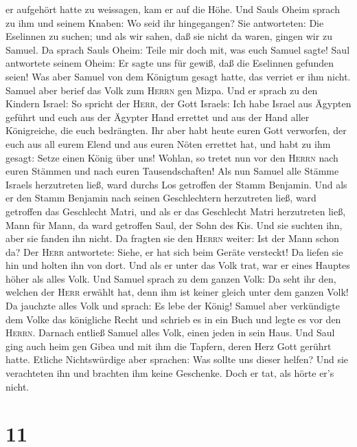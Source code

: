er aufgehört hatte zu weissagen, kam er auf die Höhe. 
Und Sauls Oheim sprach zu ihm und seinem Knaben: Wo seid ihr
hingegangen? Sie antworteten: Die Eselinnen zu suchen; und als wir
sahen, daß sie nicht da waren, gingen wir zu Samuel.  Da
sprach Sauls Oheim: Teile mir doch mit, was euch Samuel sagte!
 Saul antwortete seinem Oheim: Er sagte uns für gewiß,
daß die Eselinnen gefunden seien! Was aber Samuel von dem Königtum
gesagt hatte, das verriet er ihm nicht.  Samuel aber
berief das Volk zum \textsc{Herrn} gen Mizpa.  Und er
sprach zu den Kindern Israel: So spricht der \textsc{Herr}, der Gott
Israels: Ich habe Israel aus Ägypten geführt und euch aus der Ägypter
Hand errettet und aus der Hand aller Königreiche, die euch bedrängten.
 Ihr aber habt heute euren Gott verworfen, der euch aus
all eurem Elend und aus euren Nöten errettet hat, und habt zu ihm
gesagt: Setze einen König über uns! Wohlan, so tretet nun vor den
\textsc{Herrn} nach euren Stämmen und nach euren Tausendschaften!
 Als nun Samuel alle Stämme Israels herzutreten ließ,
ward durchs Los getroffen der Stamm Benjamin.  Und als er
den Stamm Benjamin nach seinen Geschlechtern herzutreten ließ, ward
getroffen das Geschlecht Matri, und als er das Geschlecht Matri
herzutreten ließ, Mann für Mann, da ward getroffen Saul, der Sohn des
Kis. Und sie suchten ihn, aber sie fanden ihn nicht.  Da
fragten sie den \textsc{Herrn} weiter: Ist der Mann schon da? Der
\textsc{Herr} antwortete: Siehe, er hat sich beim Geräte versteckt!
 Da liefen sie hin und holten ihn von dort. Und als er
unter das Volk trat, war er eines Hauptes höher als alles Volk.
 Und Samuel sprach zu dem ganzen Volk: Da seht ihr den,
welchen der \textsc{Herr} erwählt hat, denn ihm ist keiner gleich unter
dem ganzen Volk! Da jauchzte alles Volk und sprach: Es lebe der König!
 Samuel aber verkündigte dem Volke das königliche Recht
und schrieb es in ein Buch und legte es vor den \textsc{Herrn}. Darnach
entließ Samuel alles Volk, einen jeden in sein Haus.  Und
Saul ging auch heim gen Gibea und mit ihm die Tapfern, deren Herz Gott
gerührt hatte.  Etliche Nichtswürdige aber sprachen: Was
sollte uns dieser helfen? Und sie verachteten ihn und brachten ihm keine
Geschenke. Doch er tat, als hörte er's nicht.

\hypertarget{section-10}{%
\section{11}\label{section-10}}

